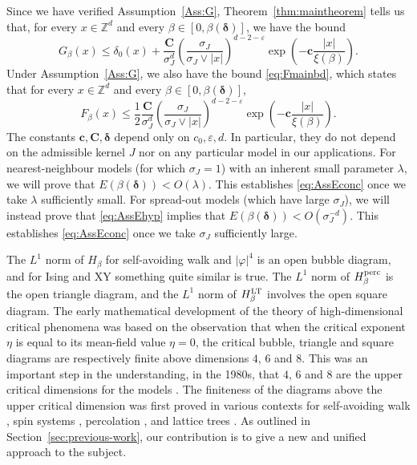\documentclass[11pt,a4paper]{article}
\numberwithin{equation}{section}
\theoremstyle{plain}
\theoremstyle{definition}
\newcommand\1{\mathds{1}}
\newcommand\bfc{\mathbf{c}}
\newcommand\bfC{\mathbf{C}}
\newcommand{\deltamain}{\boldsymbol{\delta}}
\begin{document}
Since we have verified Assumption~\ref{Ass:G}, Theorem~\ref{thm:maintheorem} tells us that, for every $x\in\mathbb{Z}^d$ and every $\beta
\in [0,\beta(\deltamain)]$, we have the bound
\begin{equation}
\label{eq:AssEhyp}
	G_\beta(x)\leq \delta_0(x)
    + \frac{ \bfC}{\sigma_J^d}
    \left(\frac{\sigma_J}{\sigma_J \vee|x|} \right)^{d-2-\varepsilon}
    \exp\left(-\bfc\frac{|x|}{\xi(\beta)}\right).
\end{equation}
Under Assumption~\ref{Ass:G},
we also have the bound \eqref{eq:Fmainbd}, which states that
for every $x\in\mathbb{Z}^d$ and every $\beta
\in [0,\beta(\deltamain)]$,
\begin{equation}
\label{eq:EhypF}
	F_\beta(x)\leq
    \frac 12 \frac{\bfC}{\sigma_J^d}
    \left(\frac{\sigma_J}{\sigma_J \vee|x|} \right)^{d-2-\varepsilon}
    \exp\left(-\bfc\frac{|x|}{\xi(\beta)}\right).
\end{equation}
The constants $\bfc,\bfC,\deltamain$ depend only on $c_0,\varepsilon,d$.
In particular, they do not depend on the admissible kernel $J$ nor on any
particular model in our applications.
For nearest-neighbour models (for which $\sigma_J=1$) with an inherent small
parameter $\lambda$, we will prove that $E(\beta(\deltamain)) < O(\lambda)$.
This establishes \eqref{eq:AssEconc} once we take $\lambda$ sufficiently small.
For spread-out models (which have large $\sigma_J$), we will instead prove
that \eqref{eq:AssEhyp} implies that $E(\beta(\deltamain)) < O(\sigma_J^{-d})$.
This establishes \eqref{eq:AssEconc} once we take $\sigma_J$ sufficiently large.

The $L^1$ norm of $H_\beta$ for self-avoiding walk and $|\varphi|^4$ is an open
bubble diagram, and for Ising and XY something quite similar is true.
The $L^1$ norm of $H^{\rm perc}_\beta$ is the open triangle
diagram, and the $L^1$ norm of $H^{\rm LT}_\beta$ involves the open square
diagram.
The early mathematical development of the theory of high-dimensional
critical phenomena was based on the observation that when the critical exponent
$\eta$ is equal to its mean-field value $\eta=0$, the critical bubble, triangle and
square diagrams are respectively finite above dimensions $4$, $6$ and $8$.
This was an important step in the understanding, in the 1980s, that $4$, $6$ and $8$ are the upper critical
dimensions for the models \cite{Aize82,Froh82,AN84,BFG86}.
The finiteness of the diagrams above the upper critical dimension was first
proved in various contexts for self-avoiding walk \cite{BS85,HS92a}, spin
systems \cite{Aize82,Froh82}, percolation \cite{HS90a}, and lattice trees \cite{HS90b}.
As outlined in Section~\ref{sec:previous-work},
our contribution is to give a
new and unified approach to the subject.
\end{document}
